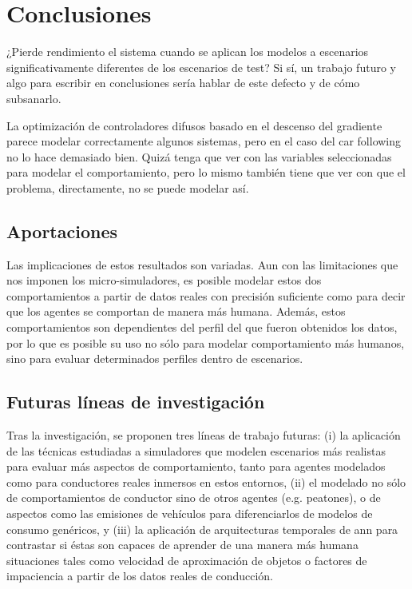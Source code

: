 \chapter{Conclusiones}
\label{ch:conclusions}


¿Pierde rendimiento el sistema cuando se aplican los modelos a escenarios significativamente diferentes de los escenarios de test? Si sí, un trabajo futuro y algo para escribir en conclusiones sería hablar de este defecto y de cómo subsanarlo.

La optimización de controladores difusos basado en el descenso del gradiente parece modelar correctamente algunos sistemas, pero en el caso del car following no lo hace demasiado bien. Quizá tenga que ver con las variables seleccionadas para modelar el comportamiento, pero lo mismo también tiene que ver con que el problema, directamente, no se puede modelar así.

\section{Aportaciones}
\label{ch:conclusions:contributions}


Las implicaciones de estos resultados son variadas. Aun con las limitaciones que nos imponen los micro-simuladores, es posible modelar estos dos comportamientos a partir de datos reales con precisión suficiente como para decir que los agentes se comportan de manera más humana. Además, estos comportamientos son dependientes del perfil del que fueron obtenidos los datos, por lo que es posible su uso no sólo para modelar comportamiento más humanos, sino para evaluar determinados perfiles dentro de escenarios.

\section{Futuras líneas de investigación}
\label{ch:conclusions:future-work}


Tras la investigación, se proponen tres líneas de trabajo futuras: (i) la aplicación de las técnicas estudiadas a simuladores que modelen escenarios más realistas para evaluar más aspectos de comportamiento, tanto para agentes modelados como para conductores reales inmersos en estos entornos, (ii) el modelado no sólo de comportamientos de conductor sino de otros agentes (e.g. peatones), o de aspectos como las emisiones de vehículos para diferenciarlos de modelos de consumo genéricos, y (iii) la aplicación de arquitecturas temporales de \ac{ann} para contrastar si éstas son capaces de aprender de una manera más humana situaciones tales como velocidad de aproximación de objetos o factores de impaciencia  a partir de los datos reales de conducción.

